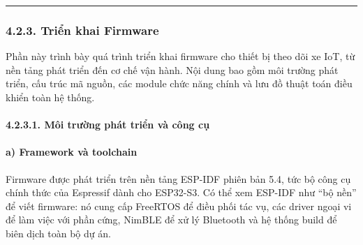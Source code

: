\documentclass[a4paper]{extarticle}
\begin{document}
\begin{center}\rule{0.5\linewidth}{0.5pt}\end{center}

\subsubsection{4.2.3. Triển khai Firmware}

Phần này trình bày quá trình triển khai firmware cho thiết bị theo dõi
xe IoT, từ nền tảng phát triển đến cơ chế vận hành. Nội dung bao gồm môi
trường phát triển, cấu trúc mã nguồn, các module chức năng chính và lưu
đồ thuật toán điều khiển toàn hệ thống.

\paragraph{4.2.3.1. Môi trường phát triển và công
cụ}\label{4231-muxf4i-trux1b0ux1eddng-phuxe1t-triux1ec3n-vuxe0-cuxf4ng-cux1ee5}

\paragraph{a) Framework và toolchain}\label{a-framework-vuxe0-toolchain}

Firmware được phát triển trên nền tảng ESP-IDF phiên bản 5.4, tức bộ
công cụ chính thức của Espressif dành cho ESP32-S3. Có thể xem ESP-IDF
như ``bộ nền'' để viết firmware: nó cung cấp FreeRTOS để điều phối tác
vụ, các driver ngoại vi để làm việc với phần cứng, NimBLE để xử lý
Bluetooth và hệ thống build để biên dịch toàn bộ dự án.
\end{document}
